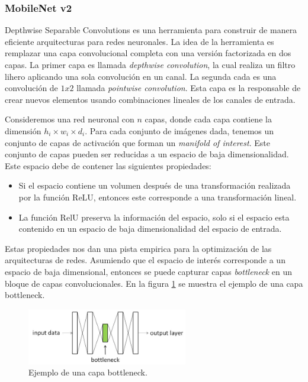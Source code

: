 \subsubsection{MobileNet v2}


Depthwise Separable Convolutions es una herramienta para construir de manera eficiente arquitecturas para redes neuronales\cite{Howard_2017,Chollet_2016,Zhang_2017}. La idea de la herramienta es remplazar una capa convolucional completa con una versión factorizada en dos capas. La primer capa es llamada \textit{depthwise convolution}, la cual realiza un filtro lihero aplicando una sola convolución en un canal. La segunda cada es una convolución de $1x2$ llamada \textit{pointwise convolution}. Esta capa es la responsable de crear nuevos elementos usando combinaciones lineales de los canales de entrada.



Consideremos una red neuronal con $n$ capas, donde cada capa contiene la dimensión $h_i \times w_i \times d_i$. Para cada conjunto de imágenes dada, tenemos un conjunto de capas de activación que forman un \textit{manifold of interest}. Este conjunto de capas pueden ser reducidas a un espacio de baja dimensionalidad. Este espacio debe de contener las siguientes propiedades:

\begin{itemize}
    \item Si el espacio contiene un volumen después de una transformación realizada por la función ReLU, entonces este corresponde a una transformación lineal.
    \item La función RelU preserva la información del espacio, solo si el espacio esta contenido en un espacio de baja dimensionalidad del espacio de entrada.
\end{itemize}

Estas propiedades nos dan una pista empirica para la optimización de las arquitecturas de redes. Asumiendo que el espacio de interés corresponde a un espacio de baja dimensional, entonces se puede capturar capas \textit{bottleneck} en un bloque de capas convolucionales. En la figura \ref{fig:bottleneck} se muestra el ejemplo de una capa bottleneck.

\begin{figure}[H]
    \centering
    \includegraphics[width=7cm]{Graphics/bottleneck.jpeg}
    \caption{Ejemplo de una capa bottleneck.}
    \label{fig:bottleneck}
\end{figure}

